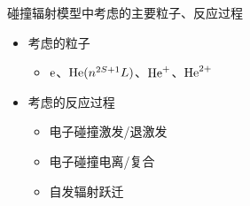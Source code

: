\begin{CJK*}{UTF8}{kai}
\begin{frame}{碰撞辐射模型中考虑的主要粒子、反应过程}
	\begin{itemize}
		\item 考虑的粒子
		\begin{itemize}
			\item ${\rm e}$、${\rm He}(n^{2S+1}L)$、${\rm He}^+$、${\rm He}^{2+}$
		\end{itemize}
		\bigskip
		\item 考虑的反应过程
		\begin{itemize}
			\item 电子碰撞激发/退激发
			\item 电子碰撞电离/复合
			\item 自发辐射跃迁
		\end{itemize}
	\end{itemize}
\end{frame}

\backupframeend

\end{CJK*}

